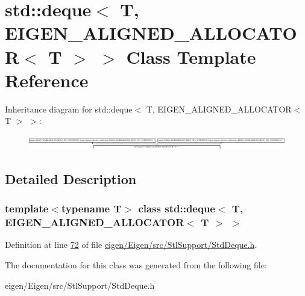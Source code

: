 \hypertarget{classstd_1_1deque_3_01_t_00_01_e_i_g_e_n___a_l_i_g_n_e_d___a_l_l_o_c_a_t_o_r_3_01_t_01_4_01_4}{}\section{std\+:\+:deque$<$ T, E\+I\+G\+E\+N\+\_\+\+A\+L\+I\+G\+N\+E\+D\+\_\+\+A\+L\+L\+O\+C\+A\+T\+OR$<$ T $>$ $>$ Class Template Reference}
\label{classstd_1_1deque_3_01_t_00_01_e_i_g_e_n___a_l_i_g_n_e_d___a_l_l_o_c_a_t_o_r_3_01_t_01_4_01_4}
Inheritance diagram for std\+:\+:deque$<$ T, E\+I\+G\+E\+N\+\_\+\+A\+L\+I\+G\+N\+E\+D\+\_\+\+A\+L\+L\+O\+C\+A\+T\+OR$<$ T $>$ $>$\+:\begin{figure}[H]
\begin{center}
\leavevmode
\includegraphics[height=0.637088cm]{classstd_1_1deque_3_01_t_00_01_e_i_g_e_n___a_l_i_g_n_e_d___a_l_l_o_c_a_t_o_r_3_01_t_01_4_01_4}
\end{center}
\end{figure}


\subsection{Detailed Description}
\subsubsection*{template$<$typename T$>$\newline
class std\+::deque$<$ T, E\+I\+G\+E\+N\+\_\+\+A\+L\+I\+G\+N\+E\+D\+\_\+\+A\+L\+L\+O\+C\+A\+T\+O\+R$<$ T $>$ $>$}



Definition at line \hyperlink{eigen_2_eigen_2src_2_stl_support_2_std_deque_8h_source_l00072}{72} of file \hyperlink{eigen_2_eigen_2src_2_stl_support_2_std_deque_8h_source}{eigen/\+Eigen/src/\+Stl\+Support/\+Std\+Deque.\+h}.



The documentation for this class was generated from the following file\+:\begin{DoxyCompactItemize}
\item 
eigen/\+Eigen/src/\+Stl\+Support/\+Std\+Deque.\+h\end{DoxyCompactItemize}
